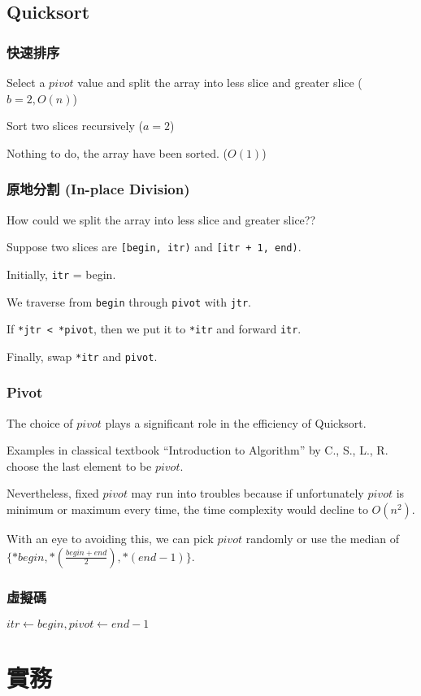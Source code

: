 \documentclass{beamer}
\begin{document}
\subsection{Quicksort}

\frame
{
	\frametitle{快速排序}
	
	\begin{description}
		\item<1->[Divide]Select a $pivot$ value and split the array into less slice and greater slice ($b = 2, O(n)$)
		\item<2->[Conquer]Sort two slices recursively ($a = 2$)
		\item<3->[Combine]Nothing to do, the array have been sorted. ($O(1)$)
	\end{description}
}

\frame
{
	\frametitle{原地分割 (In-place Division)}
	
	How could we split the array into less slice and greater slice??\pause
	
	Suppose two slices are \texttt{[begin, itr)} and \texttt{[itr + 1, end)}.\pause
	
	Initially, \texttt{itr} = begin.\pause
	
	We traverse from \texttt{begin} through \texttt{pivot} with \texttt{jtr}.\pause
	
	If \texttt{*jtr < *pivot}, then we put it to \texttt{*itr} and forward \texttt{itr}.\pause
	
	Finally, swap \texttt{*itr} and \texttt{pivot}.
}

\frame
{
	\frametitle{Pivot}
	
	The choice of $pivot$ plays a significant role in the efficiency of Quicksort.\pause
	
	Examples in classical textbook ``Introduction to Algorithm'' by C., S., L., R. choose the last element to be $pivot$.\pause
	
	Nevertheless, fixed $pivot$ may run into troubles because if unfortunately $pivot$ is minimum or maximum every time, the time complexity would decline to $O(n^2)$.\pause
	
	With an eye to avoiding this, we can pick $pivot$ randomly or use the median of $\{*begin, *(\frac{begin+end}{2}), *(end-1)\}$.
}

\frame
{
	\frametitle{虛擬碼}
	
	\begin{algorithmic}
			\pause
				\State\Return
			\EndIf
			\pause
            \State$itr\gets begin, pivot\gets end-1$
                    \State{}
                \EndIf
            \EndFor
            \State{}
            \pause
            \State{}
            \State{}
            \pause
            \State{}
        \EndProcedure
	\end{algorithmic}
}

\section{實務}
\end{document}
